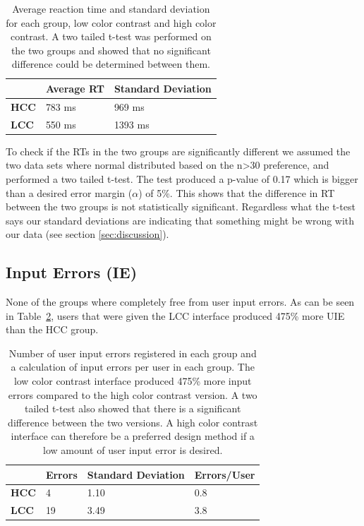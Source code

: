\documentclass[runningheads,a4paper]{llncs}
\begin{document}
\begin{table}[]
	\centering
	\setlength{\tabcolsep}{1em}
	\setlength\extrarowheight{1em}
	\begin{tabular}{l|l|l}
		\textbf{} & \textbf{Average RT} & \textbf{Standard Deviation} \\ \hline
		\textbf{HCC} & 783 ms & 969 ms \\ \hline
		\textbf{LCC} & 550 ms & 1393 ms
	\end{tabular}
	\caption{Average reaction time and standard deviation for each group, low color contrast and high color contrast. A two tailed t-test was performed on the two groups and showed that no significant difference could be determined between them.
	\label{tab:groupRT}}
\end{table}

To check if the RTs in the two groups are significantly different we assumed the two data sets where normal distributed based on the n>30 preference, and performed a two tailed t-test. The test produced a p-value of 0.17 which is bigger than a desired error margin ($\alpha$) of 5\%. This shows that the difference in RT between the two groups is not statistically significant. Regardless what the t-test says our standard deviations are indicating that something might be wrong with our data (see section \ref{sec:discussion}).

\subsection{Input Errors (IE)}\label{subsec:InputErrors}
None of the groups where completely free from user input errors. As can be seen in Table~\ref{tab:userIE}, users that were given the LCC interface produced 475\% more UIE than the HCC group.

\begin{table}[]
	\centering
	\setlength{\tabcolsep}{1em}
	\setlength\extrarowheight{1em}
	\begin{tabular}{l|l|l|l}
		\textbf{} & \textbf{Errors} & \textbf{Standard Deviation} & \textbf{Errors/User} \\ \hline
		\textbf{HCC} & 4 & 1.10 & 0.8 \\ \hline
		\textbf{LCC} & 19 & 3.49 & 3.8
	\end{tabular}
	\caption{Number of user input errors registered in each group and a calculation of input errors per user in each group. The low color contrast interface produced 475\% more input errors compared to the high color contrast version. A two tailed t-test also showed that there is a significant difference between the two versions. A high color contrast interface can therefore be a preferred design method if a low amount of user input error is desired.
	\label{tab:userIE}}
\end{table}
\end{document}
